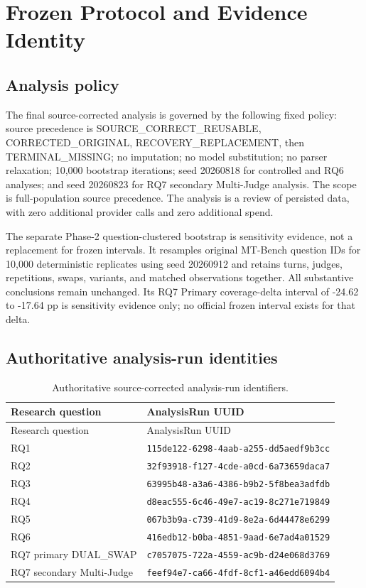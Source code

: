 \chapter{Frozen Protocol and Evidence Identity}

\section{Analysis policy}

The final source-corrected analysis is governed by the following fixed policy: source precedence is SOURCE\_CORRECT\_REUSABLE, CORRECTED\_ORIGINAL, RECOVERY\_REPLACEMENT, then TERMINAL\_MISSING; no imputation; no model substitution; no parser relaxation; 10,000 bootstrap iterations; seed 20260818 for controlled and RQ6 analyses; and seed 20260823 for RQ7 secondary Multi-Judge analysis. The scope is full-population source precedence. The analysis is a review of persisted data, with zero additional provider calls and zero additional spend.

The separate Phase-2 question-clustered bootstrap is sensitivity evidence, not a replacement for frozen intervals. It resamples original MT-Bench question IDs for 10,000 deterministic replicates using seed 20260912 and retains turns, judges, repetitions, swaps, variants, and matched observations together. All substantive conclusions remain unchanged. Its RQ7 Primary coverage-delta interval of -24.62 to -17.64 pp is sensitivity evidence only; no official frozen interval exists for that delta.

\section{Authoritative analysis-run identities}

\begin{longtable}{@{}p{}p{}@{}}
\caption{Authoritative source-corrected analysis-run identifiers.}\label{tab:run-identities}\\
\toprule Research question & AnalysisRun UUID \\\midrule
\endfirsthead
\toprule Research question & AnalysisRun UUID \\\midrule
\endhead
RQ1 & \texttt{115de122-6298-4aab-a255-dd5aedf9b3cc}\\
RQ2 & \texttt{32f93918-f127-4cde-a0cd-6a73659daca7}\\
RQ3 & \texttt{63995b48-a3a6-4386-b9b2-5f8bea3adfdb}\\
RQ4 & \texttt{d8eac555-6c46-49e7-ac19-8c271e719849}\\
RQ5 & \texttt{067b3b9a-c739-41d9-8e2a-6d44478e6299}\\
RQ6 & \texttt{416edb12-b0ba-4851-9aad-6e7ad4a01529}\\
RQ7 primary DUAL\_SWAP & \texttt{c7057075-722a-4559-ac9b-d24e068d3769}\\
RQ7 secondary Multi-Judge & \texttt{feef94e7-ca66-4fdf-8cf1-a46edd6094b4}\\
\bottomrule
\end{longtable}

